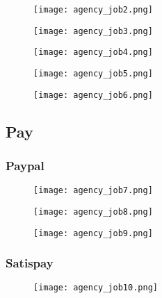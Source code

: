 \documentclass[11 pt, a4paper]{article}
\begin{document}
\clearpage
\begin{figure}[H]
\centering
\texttt{[image: agency\_job2.png]}
\end{figure}


\begin{figure}[H]
\centering
\texttt{[image: agency\_job3.png]}
\end{figure}


\clearpage
\begin{figure}[H]
\centering
\texttt{[image: agency\_job4.png]}
\end{figure}


\begin{figure}[H]
\centering
\texttt{[image: agency\_job5.png]}
\end{figure}


\clearpage
\begin{figure}[H]
\centering
\texttt{[image: agency\_job6.png]}
\end{figure}

\subsection{Pay}
\subsubsection{Paypal}

\begin{figure}[H]
\centering
\texttt{[image: agency\_job7.png]}
\end{figure}


\clearpage
\begin{figure}[H]
\centering
\texttt{[image: agency\_job8.png]}
\end{figure}


\begin{figure}[H]
\centering
\texttt{[image: agency\_job9.png]}
\end{figure}

\subsubsection{Satispay}
\clearpage
\begin{figure}[H]
\centering
\texttt{[image: agency\_job10.png]}
\end{figure}
\end{document}
